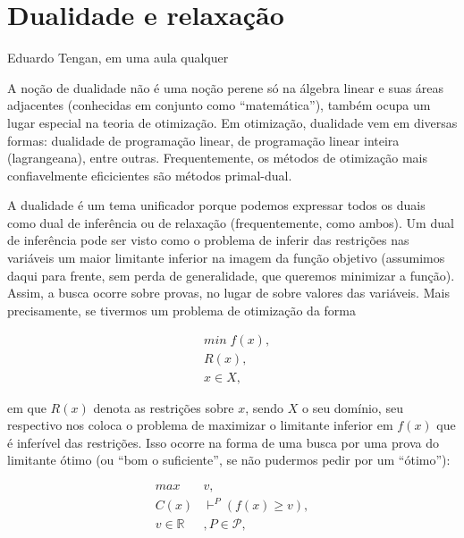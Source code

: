 
%

%

\section{Dualidade e relaxação}

\epigraph{}{Eduardo Tengan, em uma aula qualquer}

A noção de dualidade não é uma noção perene só na álgebra linear e
suas áreas adjacentes (conhecidas em conjunto como ``matemática''),
também ocupa um lugar especial na teoria de otimização. Em otimização,
dualidade vem em diversas formas: dualidade de programação linear, de
programação linear inteira (lagrangeana), entre
outras. Frequentemente, os métodos de otimização mais confiavelmente
eficicientes são métodos primal-dual.

A dualidade é um tema unificador porque podemos expressar todos os
duais como dual de inferência ou de relaxação (frequentemente, como
ambos). Um dual de inferência pode ser visto como o problema de
inferir das restrições nas variáveis um maior limitante inferior na
imagem da função objetivo (assumimos daqui para frente, sem perda de
generalidade, que queremos minimizar a função). Assim, a busca ocorre
sobre provas, no lugar de sobre valores das variáveis. Mais
precisamente, se tivermos um problema de otimização da forma

\begin{align*}
  & min \; f(x),\\ & R(x),\\ & x \in X,
\end{align*}

\noindent em que $R(x)$ denota as restrições sobre $x$, sendo $X$ o
seu domínio, seu respectivo  nos coloca
o problema de maximizar o limitante inferior em $f(x)$ que é inferível
das restrições. Isso ocorre na forma de uma busca por uma prova do
limitante ótimo (ou ``bom o suficiente'', se não pudermos pedir por um
``ótimo''):

\begin{align*}
  max \; & v,\\ C(x) & \vdash^{P} (f(x) \geq v),\\ v \in \mathbb{R}&,
  P \in \mathcal{P},
\end{align*}

